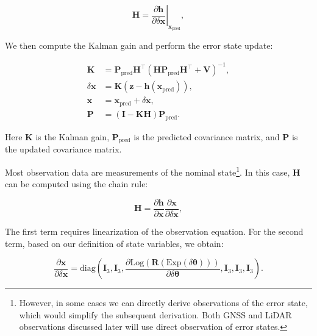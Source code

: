 \begin{equation}\label{eq:H-definition}
	\mathbf{H} = \left. \frac{\partial \mathbf{h}}{\partial \delta \mathbf{x}} \right|_{\mathbf{x}_{\text{pred}}},
\end{equation}

We then compute the Kalman gain and perform the error state update:

\begin{subequations}\label{eq:eskf-update}
	\begin{align}
		\mathbf{K} &= \mathbf{P}_{\mathrm{pred}} \mathbf{H}^\top(\mathbf{H} \mathbf{P}_{\mathrm{pred}} \mathbf{H}^\top + \mathbf{V})^{-1}, \\
		\delta \mathbf{x} &= \mathbf{K} (\mathbf{z} - \mathbf{h}(\mathbf{x}_{\mathrm{pred}})), \\
		\mathbf{x} &= \mathbf{x}_{\text{pred}} + \delta \mathbf{x}, \\
		\mathbf{P} &= (\mathbf{I} - \mathbf{K} \mathbf{H}) \mathbf{P}_{\mathrm{pred}}.
	\end{align}
\end{subequations}

Here $\mathbf{K}$ is the Kalman gain, $\mathbf{P}_{\mathrm{pred}}$ is the predicted covariance matrix, and $\mathbf{P}$ is the updated covariance matrix.

Most observation data are measurements of the nominal state\footnote{However, in some cases we can directly derive observations of the error state, which would simplify the subsequent derivation. Both GNSS and LiDAR observations discussed later will use direct observation of error states.}. In this case, $\mathbf{H}$ can be computed using the chain rule:

\begin{equation}\label{eq:H-chain-rule}
	\mathbf{H} = \frac{\partial \mathbf{h}}{\partial \mathbf{x}} \frac{\partial \mathbf{x}}{\partial \delta \mathbf{x}},
\end{equation}

The first term requires linearization of the observation equation. For the second term, based on our definition of state variables, we obtain:

\begin{equation}\label{eq:state-derivative}
	\frac{\partial \mathbf{x}}{\partial \delta \mathbf{x}} = \mathrm{diag}\left(\mathbf{I}_3, \mathbf{I}_3, \frac{\partial \mathrm{Log} (\mathbf{R}(\mathrm{Exp}(\delta \boldsymbol{\theta})))}{\partial \delta \boldsymbol{\theta}}, \mathbf{I}_3, \mathbf{I}_3, \mathbf{I}_3\right).
\end{equation}

